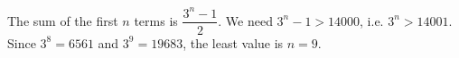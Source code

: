 The sum of the first $n$ terms is $\dfrac{3^n-1}{2}$. We need $3^n-1>14000$, i.e. $3^n>14001$. Since $3^8=6561$ and $3^9=19683$, the least value is $n=\boxed{9}$.
